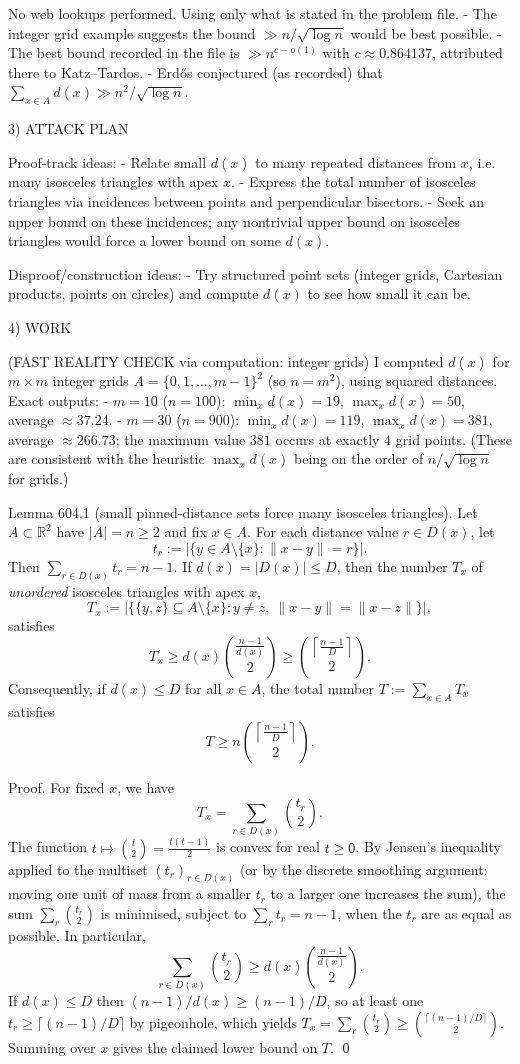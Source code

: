 No web lookups performed. Using only what is stated in the problem file.
- The integer grid example suggests the bound $\gg n/\sqrt{\log n}$ would be best possible.
- The best bound recorded in the file is $\gg n^{c-o(1)}$ with $c\approx 0.864137$, attributed there to Katz--Tardos.
- Erd\H{o}s conjectured (as recorded) that $\sum_{x\in A} d(x)\gg n^2/\sqrt{\log n}$.

3) ATTACK PLAN

Proof-track ideas:
- Relate small $d(x)$ to many repeated distances from $x$, i.e. many isosceles triangles with apex $x$.
- Express the total number of isosceles triangles via incidences between points and perpendicular bisectors.
- Seek an upper bound on these incidences; any nontrivial upper bound on isosceles triangles would force a lower bound on some $d(x)$.

Disproof/construction ideas:
- Try structured point sets (integer grids, Cartesian products, points on circles) and compute $d(x)$ to see how small it can be.

4) WORK

(FAST REALITY CHECK via computation: integer grids)
I computed $d(x)$ for $m\times m$ integer grids $A=\{0,1,\dots,m-1\}^2$ (so $n=m^2$), using squared distances.
Exact outputs:
- $m=10$ ($n=100$): $\min_x d(x)=19$, $\max_x d(x)=50$, average $\approx 37.24$.
- $m=30$ ($n=900$): $\min_x d(x)=119$, $\max_x d(x)=381$, average $\approx 266.73$; the maximum value $381$ occurs at exactly $4$ grid points.
(These are consistent with the heuristic $\max_x d(x)$ being on the order of $n/\sqrt{\log n}$ for grids.)

Lemma 604.1 (small pinned-distance sets force many isosceles triangles).
Let $A\subset\mathbb R^2$ have $|A|=n\ge 2$ and fix $x\in A$.
For each distance value $r\in D(x)$, let
\[
t_r := |\{y\in A\setminus\{x\}: \|x-y\|=r\}|.
\]
Then $\sum_{r\in D(x)} t_r = n-1$.
If $d(x)=|D(x)|\le D$, then the number $T_x$ of \emph{unordered} isosceles triangles with apex $x$,
\[
T_x := |\{\{y,z\}\subseteq A\setminus\{x\}: y\neq z,\ \|x-y\|=\|x-z\|\}|,
\]
satisfies
\[
T_x \ge d(x)\binom{\frac{n-1}{d(x)}}{2} \ge \binom{\left\lceil\frac{n-1}{D}\right\rceil}{2}.
\]
Consequently, if $d(x)\le D$ for all $x\in A$, the total number $T:=\sum_{x\in A} T_x$ satisfies
\[
T \ge n\binom{\left\lceil\frac{n-1}{D}\right\rceil}{2}.
\]

Proof.
For fixed $x$, we have
\[
T_x = \sum_{r\in D(x)} \binom{t_r}{2}.
\]
The function $t\mapsto \binom{t}{2}=\frac{t(t-1)}{2}$ is convex for real $t\ge 0$.
By Jensen's inequality applied to the multiset $(t_r)_{r\in D(x)}$ (or by the discrete smoothing argument: moving one unit of mass from a smaller $t_r$ to a larger one increases the sum), the sum $\sum_r \binom{t_r}{2}$ is minimised, subject to $\sum_r t_r=n-1$, when the $t_r$ are as equal as possible.
In particular,
\[
\sum_{r\in D(x)} \binom{t_r}{2} \ge d(x)\binom{\frac{n-1}{d(x)}}{2}.
\]
If $d(x)\le D$ then $(n-1)/d(x)\ge (n-1)/D$, so at least one $t_r\ge \lceil (n-1)/D\rceil$ by pigeonhole, which yields
$T_x=\sum_r\binom{t_r}{2}\ge \binom{\lceil (n-1)/D\rceil}{2}$.
Summing over $x$ gives the claimed lower bound on $T$.
\qed


